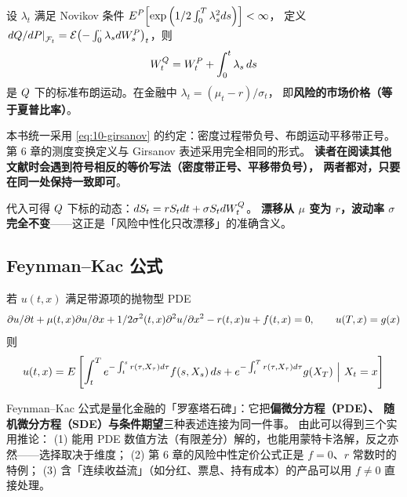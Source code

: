 \begin{theorem}[Girsanov]\label{thm:10-girsanov}
设 $\lambda_t$ 满足 Novikov 条件 $E^{P}\!\left[\exp\left(1/2\int_0^T\lambda_s^2d s\right)\right]<\infty$，
定义 $\left.dQ/dP\right|_{\mathcal{F}_t}=\mathcal{E}\!\left(-\int_0^{\cdot}\lambda_sd W_s^{P}\right)_t$，则
\begin{equation}
  W_t^{Q} = W_t^{P}+\int_0^{t}\lambda_s\,d s
  \label{eq:10-girsanov}
\end{equation}
是 $Q$ 下的标准布朗运动。在金融中 $\lambda_t=\left(\mu_t-r\right)/\sigma_t$，
即\textbf{风险的市场价格（等于夏普比率）}。
\end{theorem}

\begin{notebox}[与第 6 章的符号约定一致]
本书统一采用 \cref{eq:10-girsanov} 的约定：密度过程带负号、布朗运动平移带正号。
第 6 章的测度变换定义与 Girsanov 表述采用完全相同的形式。
\textbf{读者在阅读其他文献时会遇到符号相反的等价写法（密度带正号、平移带负号），
两者都对，只要在同一处保持一致即可}。
\end{notebox}

代入可得 $Q$ 下标的动态：$d S_t = rS_td t+\sigma S_td W_t^{Q}$。
\textbf{漂移从 $\mu$ 变为 $r$，波动率 $\sigma$ 完全不变}——这正是「风险中性化只改漂移」的准确含义。

\subsection{Feynman--Kac 公式}

\begin{theorem}\label{thm:10-feynman-kac}
若 $u(t,x)$ 满足带源项的抛物型 PDE
\begin{equation}
  \partial u/\partial t+\mu(t,x)\partial u/\partial x+1/2\sigma^{2}(t,x)\partial^2 u/\partial x^2-r(t,x)u+f(t,x)=0,
  \qquad u(T,x)=g(x)
  \label{eq:10-fk-pde}
\end{equation}
则
\begin{equation}
  u(t,x) = \E\left[\int_t^{T}\ee^{-\int_t^{s}r(\tau,X_\tau)\dd\tau}f(s,X_s)\,\dd s
        +\ee^{-\int_t^{T}r(\tau,X_\tau)\dd\tau}g(X_T)\ \Big|\ X_t=x\right]
  \label{eq:10-fk}
\end{equation}
\end{theorem}

\begin{keybox}
Feynman--Kac 公式是量化金融的「罗塞塔石碑」：它把\textbf{偏微分方程（PDE）、
随机微分方程（SDE）与条件期望}三种表述连接为同一件事。
由此可以得到三个实用推论：
(1) 能用 PDE 数值方法（有限差分）解的，也能用蒙特卡洛解，反之亦然——选择取决于维度；
(2) 第 6 章的风险中性定价公式正是 $f=0$、$r$ 常数时的特例；
(3) 含「连续收益流」（如分红、票息、持有成本）的产品可以用 $f\ne0$ 直接处理。
\end{keybox}

